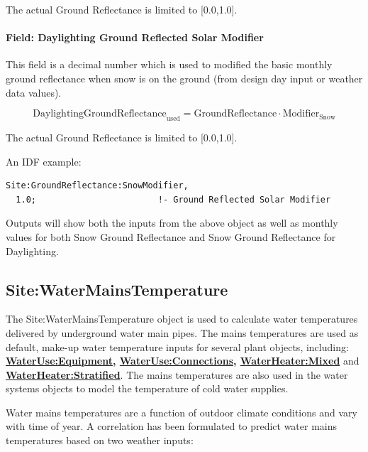 The actual Ground Reflectance is limited to {[}0.0,1.0{]}.

\paragraph{Field: Daylighting Ground Reflected Solar Modifier}\label{field-daylighting-ground-reflected-solar-modifier}

This field is a decimal number which is used to modified the basic monthly ground reflectance when snow is on the ground (from design day input or weather data values).

\begin{equation}
\mathrm{DaylightingGroundReflectance}_{\mathrm{used}} = \mathrm{GroundReflectance} \cdot \mathrm{Modifier}_{\mathrm{Snow}}
\end{equation}

The actual Ground Reflectance is limited to {[}0.0,1.0{]}.

An IDF example:

\begin{lstlisting}
Site:GroundReflectance:SnowModifier,
  1.0;                        !- Ground Reflected Solar Modifier
\end{lstlisting}

Outputs will show both the inputs from the above object as well as monthly values for both Snow Ground Reflectance and Snow Ground Reflectance for Daylighting.

\subsection{Site:WaterMainsTemperature}\label{sitewatermainstemperature}

The Site:WaterMainsTemperature object is used to calculate water temperatures delivered by underground water main pipes. The mains temperatures are used as default, make-up water temperature inputs for several plant objects, including: \textbf{\hyperref[wateruseequipment]{WaterUse:Equipment}, \hyperref[wateruseconnections]{WaterUse:Connections}, \hyperref[waterheatermixed]{WaterHeater:Mixed}} and \textbf{\hyperref[waterheaterstratified]{WaterHeater:Stratified}}. The mains temperatures are also used in the water systems objects to model the temperature of cold water supplies.

Water mains temperatures are a function of outdoor climate conditions and vary with time of year. A correlation has been formulated to predict water mains temperatures based on two weather inputs:

